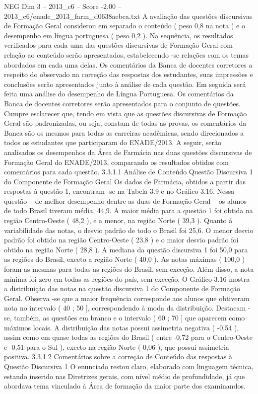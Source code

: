 \begin{textsample}{NEG Dim 3 – 2013\_c6 – Score -2.00 – 2013\_c6/enade\_2013\_farm\_d0638aebea.txt}
A avaliação das questões discursivas de Formação Geral considerou em separado o conteúdo ( peso 0,8 na nota ) e o desempenho em língua portuguesa ( peso 0,2 ).
Na sequência, os resultados verificados para cada uma das questões discursivas de Formação Geral com relação ao conteúdo serão apresentados, estabelecendo -se relações com os temas abordados em cada uma delas.
Os comentários da Banca de docentes corretores a respeito do observado na correção das respostas dos estudantes, suas impressões e conclusões serão apresentados junto à análise de cada questão.
Em seguida será feita uma análise do desempenho de Língua Portuguesa.
Os comentários da Banca de docentes corretores serão apresentados para o conjunto de questões.
Cumpre esclarecer que, tendo em vista que as questões discursivas de Formação Geral são padronizadas, ou seja, constam de todas as provas, os comentários da Banca são os mesmos para todas as carreiras acadêmicas, sendo direcionados a todos os estudantes que participaram do ENADE/2013.
A seguir, serão analisados os desempenhos da Área de Farmácia nas duas questões discursivas de Formação Geral do ENADE/2013, comparando os resultados obtidos com comentários para cada questão. 3.3.1.1 Análise de Conteúdo Questão Discursiva 1 do Componente de Formação Geral Os dados de Farmácia, obtidos a partir das respostas à questão 1, encontram -se na Tabela 3.9 e no Gráfico 3.16.
Nessa questão – de melhor desempenho dentre as duas de Formação Geral – os alunos de todo Brasil tiveram média, 44,9.
A maior média para a questão 1 foi obtida na região Centro-Oeste ( 48,2 ), e a menor, na região Norte ( 39,3 ).
Quanto à variabilidade das notas, o desvio padrão de todo o Brasil foi 25,6.
O menor desvio padrão foi obtido na região Centro-Oeste ( 23,8 ) e o maior desvio padrão foi obtido na região Norte ( 28,8 ).
A mediana da questão discursiva 1 foi 50,0 para as regiões do Brasil, exceto a região Norte ( 40,0 ).
As notas máximas ( 100,0 ) foram as mesmas para todas as regiões do Brasil, sem exceção.
Além disso, a nota mínima foi zero em todas as regiões do país, sem exceção.
O Gráfico 3.16 mostra a distribuição das notas na questão discursiva 1 do Componente de Formação Geral.
Observa -se que a maior frequência corresponde aos alunos que obtiveram nota no intervalo ( 40 ; 50 ], correspondendo à moda da distribuição.
Destacam -se, também, as questões em branco e o intervalo ( 60 ; 70 ] que aparecem como máximos locais.
A distribuição das notas possui assimetria negativa ( -0,54 ), assim como em quase todas as regiões do Brasil ( entre -0,72 para o Centro-Oeste e -0,51 para o Sul ), exceto na região Norte ( 0,06 ), que possui assimetria positiva. 3.3.1.2 Comentários sobre a correção de Conteúdo das respostas à Questão Discursiva 1 O enunciado restou claro, elaborado com linguagem técnica, estando inserido nas Diretrizes gerais, com nível médio de profundidade, já que abordava tema vinculado à Área de formação da maior parte dos examinandos.

\end{textsample}
